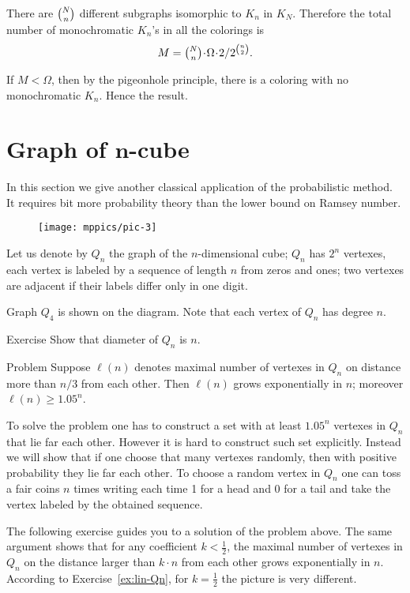 There are $\tbinom Nn$ different subgraphs isomorphic to $K_n$ in $K_N$.
Therefore the total number of monochromatic $K_n$'s in all the colorings 
is 
\[M=\tbinom Nn\cdot\Omega\cdot  2/2^{\binom n2}.\]

If $M<\Omega$, then by the pigeonhole principle,
there is a coloring with no monochromatic $K_n$.
Hence the result.
\qeds

\section*{Graph of $\bm{n}$-cube}

In this section we give another classical application of the probabilistic method.
It requires bit more probability theory than the lower bound on Ramsey number. 

\begin{wrapfigure}{r}{25mm}
\vskip-0mm
\centering
\texttt{[image: mppics/pic-3]}
\vskip-0mm
\end{wrapfigure}

Let us denote by $Q_n$ the graph of the $n$-dimensional cube;
$Q_n$ has $2^n$ vertexes, each vertex is labeled by a sequence of length $n$ from zeros and ones;
two vertexes are adjacent if their labels differ only in one digit.

Graph $Q_4$ is shown on the diagram.
Note that each vertex of $Q_n$ has degree $n$.


\begin{thm}{Exercise}
Show that diameter of $Q_n$ is $n$. 
\end{thm}


\begin{thm}{Problem}\label{prob:Qn}
Suppose $\ell(n)$ denotes maximal number of vertexes in $Q_n$ on distance more than $n/3$ from each other.
Then $\ell(n)$ grows exponentially in $n$;
moreover $\ell(n)\ge 1.05^n$. 
\end{thm}

To solve the problem one has to construct a set with at least $1.05^n$ vertexes in $Q_n$ that lie far each other.
However it is hard to construct such set explicitly.
Instead we will show that if one choose that many vertexes randomly, then with positive probability they lie far each other.
To choose a random vertex in $Q_n$ one can toss a fair coins $n$ times writing each time 1 for a head and 0 for a tail and take the vertex labeled by the obtained sequence.

The following exercise guides you to a solution of the problem above.
The same argument shows that for any coefficient $k<\tfrac12$, the maximal number of vertexes in $Q_n$ on the distance larger than $k\cdot n$ from each other grows exponentially in $n$.
According to Exercise~\ref{ex:lin-Qn}, for $k= \tfrac12$ the picture is very different.

